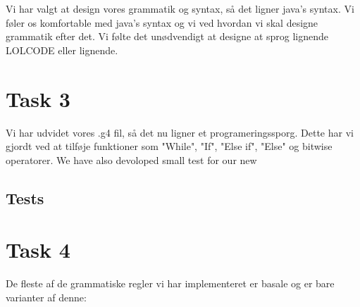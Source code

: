 \documentclass[12pt,a4paper]{report} %
\begin{document}
    Vi har valgt at design vores grammatik og syntax, så det ligner java's syntax. Vi føler os komfortable med java's syntax og vi ved hvordan vi skal designe grammatik efter det. Vi følte det unødvendigt at designe at sprog lignende LOLCODE eller lignende.
    
    \section*{Task 3}
    Vi har udvidet vores .g4 fil, så det nu ligner et programeringssporg. Dette har vi gjordt ved at tilføje funktioner som "While", "If", "Else if", "Else" og bitwise operatorer. 
    We have also devoloped small test for our new 
    

    
    \subsection*{Tests}
    
    \section*{Task 4}
    De fleste af de grammatiske regler vi har implementeret er basale og er bare varianter af denne:
    
    
\end{document}
